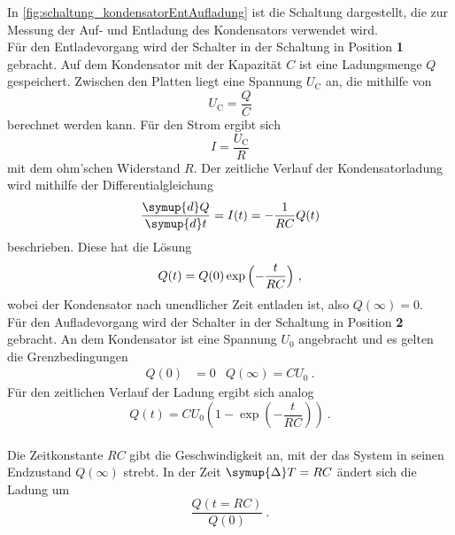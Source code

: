     In \autoref{fig:schaltung_kondensatorEntAufladung} ist die Schaltung dargestellt,
    die zur Messung der Auf- und Entladung des Kondensators verwendet wird.\\
    Für den Entladevorgang wird der Schalter in der Schaltung in Position \textbf{1} gebracht.
    Auf dem Kondensator mit der Kapazität $C$ ist eine Ladungsmenge $Q$ gespeichert.
    Zwischen den Platten liegt eine Spannung $U_\text{C}$ an,
    die mithilfe von
    \begin{equation}
        U_\text{C} = \frac{Q}{C}
        \label{eqn:kondensatorspannung}
    \end{equation}
    berechnet werden kann.
    Für den Strom ergibt sich
    \begin{equation}
        I = \frac{U_\text{C}}{R}
        \label{eqn:strom_ohmgesetz}
    \end{equation}
    mit dem ohm'schen Widerstand $R$.
    Der zeitliche Verlauf der Kondensatorladung wird mithilfe der Differentialgleichung
    \begin{equation}
        \frac{\symup{d}Q}{\symup{d}t} = I(t) = - \frac{1}{RC} Q(t)
        \label{eqn:dgl_ladung}
    \end{equation}
    beschrieben.
    Diese hat die Lösung
    \begin{equation}
        Q(t) = Q(0) \exp{\Bigl(- \frac{t}{RC}\Bigr)} \ ,
        \label{eqn:entladung}
    \end{equation}
    wobei der Kondensator nach unendlicher Zeit entladen ist,
    also $Q(\infty) = 0$. \\
    Für den Aufladevorgang wird der Schalter in der Schaltung in Position \textbf{2} gebracht.
    An dem Kondensator ist eine Spannung $U_0$ angebracht und es gelten die Grenzbedingungen
    \begin{align*}
        Q(0) &= 0 & Q(\infty) = C U_0 \ .
    \end{align*}
    Für den zeitlichen Verlauf der Ladung ergibt sich analog
    \begin{equation}
        Q(t) = C U_0 \left(1 - \exp{\left(-\frac{t}{RC}\right)}\right) \ .
        \label{eqn:aufladung}
    \end{equation}
    \\
    Die Zeitkonstante $RC$ gibt die Geschwindigkeit an,
    mit der das System in seinen Endzustand $Q(\infty)$ strebt.
    In der Zeit $\symup{\Delta}T = RC$ ändert sich die Ladung um
    \begin{equation*}
        \frac{Q(t=RC)}{Q(0)} \ .
    \end{equation*}


